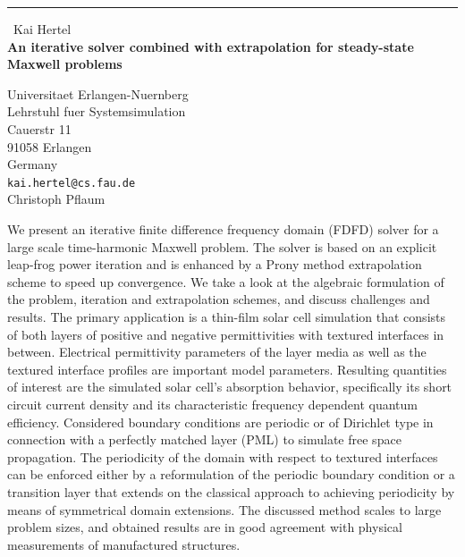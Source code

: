 \documentclass{report}
\begin{document}
\begin{center}
\rule{6in}{1pt} \
{\large Kai Hertel \\
{\bf An iterative solver combined with extrapolation for steady-state Maxwell problems}}

Universitaet Erlangen-Nuernberg \\ Lehrstuhl fuer Systemsimulation \\ Cauerstr 11 \\ 91058 Erlangen \\ Germany
\\
{\tt kai.hertel@cs.fau.de}\\
Christoph Pflaum\end{center}

We present an iterative finite difference frequency domain (FDFD) solver
for a large scale time-harmonic Maxwell problem. The solver is based on
an explicit leap-frog power iteration and is enhanced by a Prony method
extrapolation scheme to speed up convergence.
We take a look at the algebraic formulation of the problem, iteration and
extrapolation schemes, and discuss challenges and results.
The primary application is a thin-film solar cell simulation that
consists of both layers of positive and negative permittivities with
textured interfaces in between.
Electrical permittivity parameters of the layer media as well as the
textured interface profiles are important model parameters.
Resulting quantities of interest are the simulated solar cell's
absorption behavior, specifically its short circuit current density and
its characteristic frequency dependent quantum efficiency.
Considered boundary conditions are periodic or of Dirichlet type in
connection with a perfectly matched layer (PML) to simulate free space
propagation.
The periodicity of the domain with respect to textured interfaces can be
enforced either by a reformulation of the periodic boundary condition or
a transition layer that extends on the classical approach to achieving
periodicity by means of symmetrical domain extensions.
The discussed method scales to large problem sizes, and obtained results
are in good agreement with physical measurements of manufactured
structures.
\end{document}
